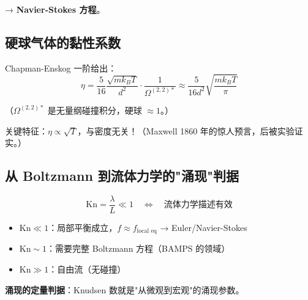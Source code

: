 \documentclass[11pt,a4paper]{article}
\begin{document}
→ \textbf{Navier-Stokes 方程}。

\subsection{硬球气体的黏性系数}

Chapman-Enskog 一阶给出：
\begin{equation}
\eta = \frac{5}{16}\frac{\sqrt{mk_BT}}{d^2}\cdot\frac{1}{\Omega^{(2,2)*}} \approx \frac{5}{16d^2}\sqrt{\frac{mk_BT}{\pi}}
\end{equation}

（$\Omega^{(2,2)*}$ 是无量纲碰撞积分，硬球 $\approx 1$。）

关键特征：$\eta \propto \sqrt{T}$，与密度无关！（Maxwell 1860 年的惊人预言，后被实验证实。）

\subsection{从 Boltzmann 到流体力学的"涌现"判据}

\begin{equation}
\text{Kn} = \frac{\lambda}{L} \ll 1 \quad \Longleftrightarrow \quad \text{流体力学描述有效}
\end{equation}

\begin{itemize}
\item $\text{Kn} \ll 1$：局部平衡成立，$f \approx f_{\text{local eq}}$ → Euler/Navier-Stokes
\item $\text{Kn} \sim 1$：需要完整 Boltzmann 方程（BAMPS 的领域）
\item $\text{Kn} \gg 1$：自由流（无碰撞）
\end{itemize}

\textbf{涌现的定量判据}：Knudsen 数就是"从微观到宏观"的涌现参数。
\end{document}
